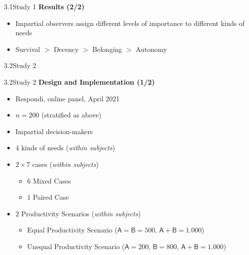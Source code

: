 \documentclass[xcolor=table,9pt,aspectratio=169]{beamer}
\begin{document}
\begin{frame}{\vspace*{10mm}3.1\hspace*{1em}Study 1}
\textbf{Results (2/2)}\\
\medskip
\begin{itemize}
   \item Impartial observers assign different levels of importance to different kinds of needs
   \item Survival $>$ Decency $>$ Belonging $>$ Autonomy
\end{itemize}
\end{frame}


\begin{frame}
\begin{overlayarea}{\textwidth}{0.81\paperheight}{
   \vspace*{11mm}
   \textcolor{uolblue}
   {3.2\hspace*{1em}Study 2}
}
\end{overlayarea}
\end{frame}


\begin{frame}{\vspace*{10mm}3.2\hspace*{1em}Study 2}
\textbf{Design and Implementation (1/2)}\\
\medskip
\begin{itemize}
   \item Respondi, online panel, April 2021
   \item $n=200$ (stratified as above)
   \item Impartial decision-makers
   \item $4$ kinds of needs (\textit{within subjects})
   \item $2\times7$ cases (\textit{within subjects})
   \begin{itemize}
      \item $6$ Mixed Cases
      \item $1$ Paired Case
   \end{itemize}
   \item $2$ Productivity Scenarios (\textit{within subjects})
   \begin{itemize}
      \item Equal Productivity Scenario ($\textsf{A}=\textsf{B}=500$, $\textsf{A}+\textsf{B}=1.000$)
      \item Unequal Productivity Scenario ($\textsf{A}=200$, $\textsf{B}=800$, $\textsf{A}+\textsf{B}=1.000$)
   \end{itemize}
\end{itemize}
\end{frame}
\end{document}
